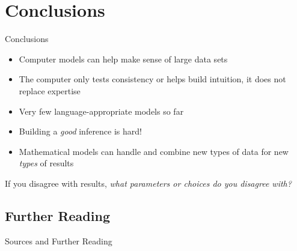 \documentclass[9pt]{beamer}
\begin{document}
\section{Conclusions}
\begin{frame}{Conclusions}
  \begin{itemize}
  \item Computer models can help make sense of large data sets
  \item The computer only tests consistency or helps build intuition, it does not replace expertise
  \item Very few language-appropriate models so far
  \item Building a \emph{good} inference is hard!
  \item Mathematical models can handle and combine new types of data for new \emph{types} of results
  \end{itemize}
  If you disagree with results, \emph{what parameters or choices do you disagree with?}
\end{frame}
\subsection{Further Reading}
\begin{frame}[t,allowframebreaks]{Sources and Further Reading}
  \nocite{mcmahon2005language}
  \printbibliography
\end{frame}
\end{document}
